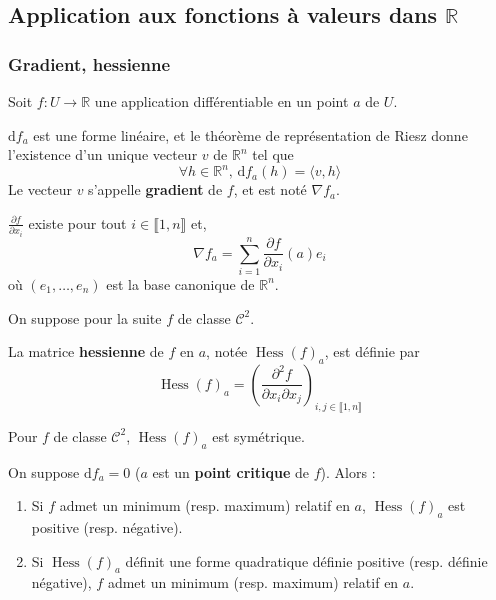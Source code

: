   \subsection{Application aux fonctions à valeurs dans \texorpdfstring{$\mathbb{R}$}{R}}

  \subsubsection{Gradient, hessienne}


  Soit $f : U \rightarrow \mathbb{R}$ une application différentiable en un point $a$ de $U$.

  \begin{definition}
    $\mathrm{d}f_a$ est une forme linéaire, et le théorème de représentation de Riesz donne l'existence d'un unique vecteur $v$ de $\mathbb{R}^n$ tel que
    \[ \forall h \in \mathbb{R}^n, \, \mathrm{d}f_a(h) = \langle v, h \rangle \]
    Le vecteur $v$ s'appelle \textbf{gradient} de $f$, et est noté $\nabla f_a$.
  \end{definition}

  \begin{proposition}
    $\frac{\partial f}{\partial x_i}$ existe pour tout $i \in \llbracket 1, n \rrbracket$ et,
    \[ \nabla f_a = \sum_{i=1}^n \frac{\partial f}{\partial x_i}(a) e_i \]
    où $(e_1, \dots, e_n)$ est la base canonique de $\mathbb{R}^n$.
  \end{proposition}


  On suppose pour la suite $f$ de classe $\mathcal{C}^2$.

  \begin{definition}
    La matrice \textbf{hessienne} de $f$ en $a$, notée $\operatorname{Hess}(f)_a$, est définie par
    \[ \operatorname{Hess}(f)_a = \left( \frac{\partial^2 f}{\partial x_i \partial x_j} \right)_{i,j \in \llbracket 1, n \rrbracket} \]
  \end{definition}

  \begin{remark}
    Pour $f$ de classe $\mathcal{C}^2$, $\operatorname{Hess}(f)_a$ est symétrique.
  \end{remark}

  \begin{theorem}
    On suppose $\mathrm{d}f_a = 0$ ($a$ est un \textbf{point critique} de $f$). Alors :
    \begin{enumerate}[label={\bfseries(\roman*)}]
      \item Si $f$ admet un minimum (resp. maximum) relatif en $a$, $\operatorname{Hess}(f)_a$ est positive (resp. négative).
      \item Si $\operatorname{Hess}(f)_a$ définit une forme quadratique définie positive (resp. définie négative), $f$ admet un minimum (resp. maximum) relatif en $a$.
    \end{enumerate}
  \end{theorem}


